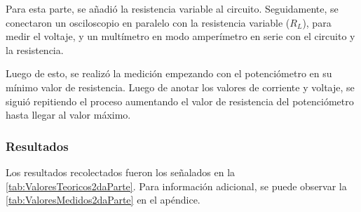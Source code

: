 \documentclass{article}
\begin{document}
            \quad Para esta parte, se añadió la resistencia variable al circuito. Seguidamente, se conectaron 
            un osciloscopio en paralelo con la resistencia variable ($R_{L}$), para medir el voltaje, y un 
            multímetro en modo amperímetro en serie con el circuito y la resistencia.\par
            Luego de esto, se realizó la medición empezando con el potenciómetro en su mínimo valor de 
            resistencia. Luego de anotar los valores de corriente y voltaje, se siguió repitiendo el 
            proceso aumentando el valor de resistencia del potenciómetro hasta llegar al valor máximo.\par
            

            \subsubsection{Resultados}
            
            \quad Los resultados recolectados fueron los señalados en la \autoref{tab:ValoresTeoricos2daParte}. Para información adicional, se puede observar la \autoref{tab:ValoresMedidos2daParte} en el apéndice.\par
\end{document}
